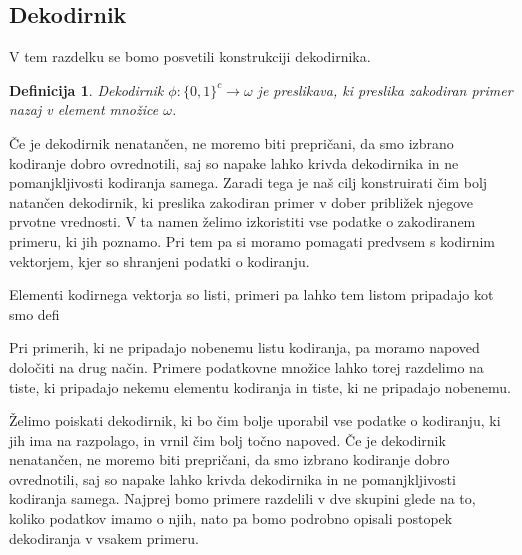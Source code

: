\documentclass[12pt,a4paper]{article}
\newtheorem{definicija}{Definicija}
\begin{document}

\subsection{Dekodirnik}

V tem razdelku se bomo posvetili konstrukciji dekodirnika.

\begin{definicija}
	\label{def-dekodiranje}
	Dekodirnik $\phi: \{0,1\}^c \rightarrow \omega$ je preslikava, ki preslika zakodiran primer nazaj v element množice $\omega$.
\end{definicija}

Če je dekodirnik nenatančen, ne moremo biti prepričani, da smo izbrano kodiranje dobro ovrednotili, saj so napake lahko krivda dekodirnika in ne pomanjkljivosti kodiranja samega.
Zaradi tega je naš cilj konstruirati čim bolj natančen dekodirnik, ki preslika zakodiran primer v dober približek njegove prvotne vrednosti.
V ta namen želimo izkoristiti vse podatke o zakodiranem primeru, ki jih poznamo.
Pri tem pa si moramo pomagati predvsem s kodirnim vektorjem, kjer so shranjeni podatki o kodiranju.


Elementi kodirnega vektorja so listi, primeri pa lahko tem listom pripadajo kot smo defi

Pri primerih, ki ne pripadajo nobenemu listu kodiranja, pa moramo napoved določiti na drug način.
Primere podatkovne množice lahko torej razdelimo na tiste, ki pripadajo nekemu elementu kodiranja in tiste, ki ne pripadajo nobenemu.


Želimo poiskati dekodirnik, ki bo čim bolje uporabil vse podatke o kodiranju, ki jih ima na razpolago, in vrnil čim bolj točno napoved.
Če je dekodirnik nenatančen, ne moremo biti prepričani, da smo izbrano kodiranje dobro ovrednotili, saj so napake lahko krivda dekodirnika in ne pomanjkljivosti kodiranja samega.
Najprej bomo primere razdelili v dve skupini glede na to, koliko podatkov imamo o njih, nato pa bomo podrobno opisali postopek dekodiranja v vsakem primeru.
\end{document}

